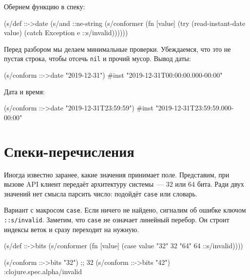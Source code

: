 \noindent
Обернем функцию в спеку:

\begin{english}
  \begin{clojure}
(s/def ::->date
  (s/and
   ::ne-string
   (s/conformer
    (fn [value]
      (try
        (read-instant-date value)
        (catch Exception e
          ::s/invalid))))))
  \end{clojure}
\end{english}

Перед разбором мы делаем минимальные проверки. Убеждаемся, что это не пустая
строка, чтобы отсечь \verb|nil| и прочий мусор. Вывод даты:

\begin{english}
  \begin{clojure}
(s/conform ::->date "2019-12-31")
#inst "2019-12-31T00:00:00.000-00:00"
  \end{clojure}
\end{english}

\noindent
Дата и время:

\begin{english}
  \begin{clojure}
(s/conform ::->date "2019-12-31T23:59:59")
#inst "2019-12-31T23:59:59.000-00:00"
  \end{clojure}
\end{english}

\section{Спеки-перечисления}


Иногда известно заранее, какие значения принимает поле. Представим, при вызове
API клиент передаёт архитектуру системы~--- 32 или 64 бита. Ради двух значений
нет смысла парсить число: подойдёт \verb|case| или словарь.

Вариант с макросом \verb|case|. Если ничего не найдено, сигналим об ошибке
ключом \verb|::s/invalid|. Заметим, что \verb|case| не означает линейный
перебор. Он строит индексы веток и сразу переходит на нужную.


\begin{english}
  \begin{clojure}
(s/def ::->bits
  (s/conformer
   (fn [value]
     (case value
       "32" 32
       "64" 64
       ::s/invalid))))

(s/conform ::->bits "32") ;; 32
(s/conform ::->bits "42") :clojure.spec.alpha/invalid
  \end{clojure}
\end{english}

